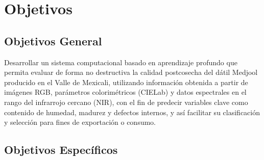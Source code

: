 \section{Objetivos}

\subsection{Objetivos General}

Desarrollar un sistema computacional basado en aprendizaje profundo que permita evaluar de forma no destructiva la calidad postcosecha del dátil Medjool producido en el Valle de Mexicali, utilizando información obtenida a partir de imágenes RGB, parámetros colorimétricos (CIELab) y datos espectrales en el rango del infrarrojo cercano (NIR), con el fin de predecir variables clave como contenido de humedad, madurez y defectos internos, y así facilitar su clasificación y selección para fines de exportación o consumo.

\subsection{Objetivos Específicos}

